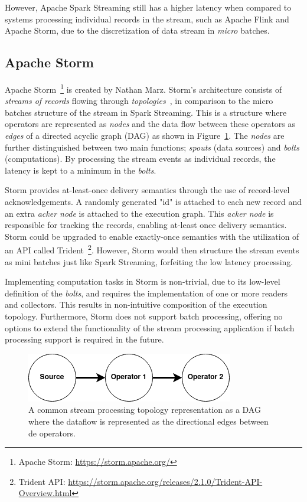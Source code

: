 However, Apache Spark Streaming still has a 
higher latency when compared to systems processing individual records in the stream, 
such as Apache Flink and Apache Storm, due to the discretization of 
data stream in \emph{micro} batches. 


\subsection{Apache Storm}%
\label{sub:Apache Storm}

Apache Storm~\footnote{Apache Storm: \url{https://storm.apache.org/}} is 
created by Nathan Marz.
Storm's architecture 
consists of \emph{streams of records} flowing through
\emph{topologies}~\cite{storm_twitter}, in comparison to 
the micro batches structure of the stream in Spark Streaming. 
This is a structure where operators are 
represented as \emph{nodes} and the data flow between these operators as \emph{edges} of 
a directed acyclic graph (DAG) as shown in Figure~\ref{fig:dag_topology}. 
The \emph{nodes} are further distinguished between 
two main functions; \emph{spouts} (data sources) and \emph{bolts} (computations).  
By processing the stream events as individual records, the latency is kept 
to a minimum in the \emph{bolts}. 

Storm provides at-least-once 
delivery semantics through the use of record-level acknowledgements. A randomly 
generated "id" is attached to each new record and an extra \emph{acker node} is attached 
to the execution graph. This \emph{acker node} is responsible for tracking the records, 
enabling at-least once delivery semantics. Storm could be upgraded to enable 
exactly-once semantics with the utilization of an API called
Trident~\footnote{Trident API: \url{https://storm.apache.org/releases/2.1.0/Trident-API-Overview.html}}. 
However, Storm would then structure the stream events as mini batches just like 
Spark Streaming, forfeiting the low latency processing. 

Implementing computation tasks 
in Storm is non-trivial, due to its low-level definition of the \emph{bolts}, 
and requires the implementation of one or more readers and 
collectors. This results in non-intuitive composition of the execution topology. 
Furthermore, Storm does not support 
batch processing, offering no options to extend the functionality of the stream 
processing application if batch processing support is required in the future. 


\begin{figure}[!htpb]
    \centering
    \includegraphics[width=0.5\linewidth]{fig/dag.png}
    \caption{A common stream processing topology representation as a DAG where the 
    dataflow is represented as the directional edges between de operators.} 
    \label{fig:dag_topology}
\end{figure}


